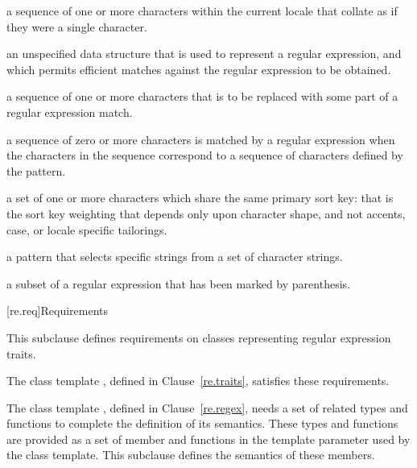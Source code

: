 %
%
a sequence of one or more characters within the
current locale that collate as if they were a single character.

%
an unspecified data structure that is used to
represent a regular expression, and which permits efficient matches
against the regular expression to be obtained.

%
a sequence of one or more characters that is to be
replaced with some part of a regular expression match.

%
%
a sequence of zero or more characters is matched by 
a regular expression when the characters in the sequence
correspond to a sequence of characters defined by the pattern.

% 
%
a set of one or more characters which
share the same primary sort key: that is the sort key weighting that
depends only upon character shape, and not accents, case, or
locale specific tailorings.

a pattern that selects specific strings
from a set of character strings.

%
a subset of a regular expression that has
been marked by parenthesis.

[re.req]{Requirements}

\pnum
This subclause defines requirements on classes representing regular
expression traits.  \begin{note} The class template
, defined in Clause~\ref{re.traits},
satisfies these requirements.  \end{note}

\pnum
The class template , defined in
Clause~\ref{re.regex}, needs a set of related types and
functions to complete the definition of its semantics. These types
and functions are provided as a set of member  and functions
in the template parameter  used by the  class
template. This subclause defines the semantics of these
members.

